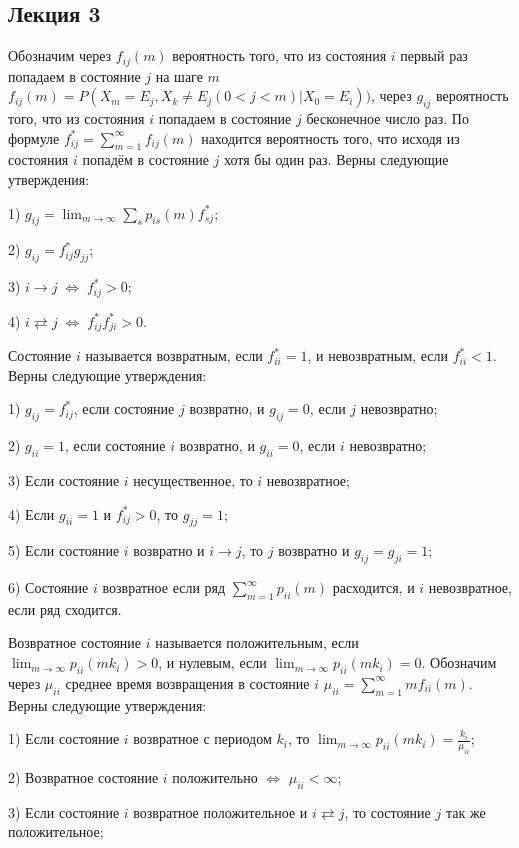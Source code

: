 
\subsection{Лекция 3}

Обозначим через $f_{ij}(m)$ вероятность того, что из состояния $i$ первый раз попадаем в состояние $j$ на шаге $m$
$f_{ij}(m)=P(X_m=E_j,X_k\ne E_j (0<j<m) | X_0 =E_i))$, через $g_{ij}$ вероятность того, что из состояния $i$ попадаем в состояние $j$ бесконечное число раз. По формуле $f^*_{ij}=\sum_{m=1}^\infty f_{ij}(m)$ находится вероятность того, что исходя из состояния $i$ попадём в состояние $j$ хотя бы один раз.
Верны следующие утверждения:

1) $g_{ij}=\lim_{m \to \infty } \sum _s p_{is}(m) f^*_{sj}$;

2) $g_{ij}=f^*_{ij}g_{jj}$;

3) $i \to j \;\Leftrightarrow\; f_{ij}^* > 0$;

4) $i \rightleftarrows j \;\Leftrightarrow\; f_{ij}^* f_{ji}^* > 0$.

Состояние $i$ называется возвратным, если $f^*_{ii}=1$, и невозвратным, если $f^*_{ii}<1$.
Верны следующие утверждения:

1) $g_{ij}=f^*_{ij}$, если состояние $j$ возвратно, и $g_{ij}=0$, если $j$ невозвратно;

2) $g_{ii}=1$, если состояние $i$ возвратно, и $g_{ii}=0$, если $i$ невозвратно;

3) Если состояние $i$ несущественное, то $i$ невозвратное;

4) Если $g_{ii}=1$ и $f^*_{ij}>0$, то $g_{jj}=1$;

5) Если состояние $i$ возвратно и $i \to j$, то $j$ возвратно и $g_{ij}=g_{ji}=1$;

6) Состояние $i$ возвратное если ряд $\sum_{m=1}^\infty p_{ii}(m)$ расходится, и $i$ невозвратное, если ряд сходится.


Возвратное состояние $i$ называется положительным, если $\lim_{m \to \infty } p_{ii}(mk_i)>0$, и нулевым, если $\lim_{m \to \infty } p_{ii}(mk_i)=0$.
Обозначим через $\mu_{ii}$ среднее время возвращения в состояние $i$ $\mu_{ii}=\sum_{m=1}^\infty mf_{ii}(m)$.
Верны следующие утверждения:

1) Если состояние $i$ возвратное с периодом $k_i$, то $\lim_{m \to \infty} p_{ii} (mk_i)=\frac{k_i}{\mu _{ii}}$;

2) Возвратное состояние $i$ положительно $\Leftrightarrow$ $\mu _{ii}< \infty$;

3) Если состояние $i$ возвратное положительное и $i \rightleftarrows j$, то состояние $j$ так же положительное;

